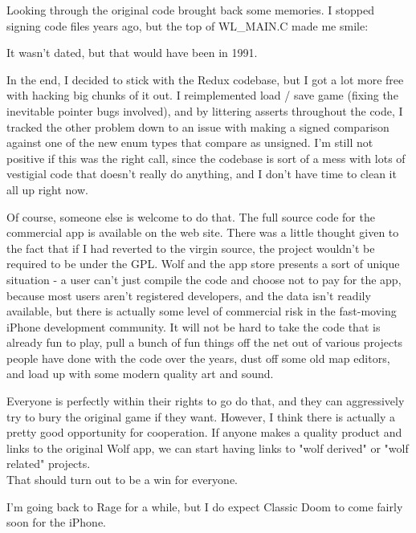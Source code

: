 Looking through the original code brought back some memories.  I stopped signing code files years ago, but the top of WL\_MAIN.C made me smile:\\
\par
\begin{minipage}{\textwidth}

\end{minipage}
\par
It wasn't dated, but that would have been in 1991.\\
\par

In the end, I decided to stick with the Redux codebase, but I got a lot more free with hacking big chunks of it out.  I reimplemented load / save game (fixing the inevitable pointer bugs involved), and by littering asserts throughout the code, I tracked the other problem down to an issue with making a signed comparison against one of the new enum types that compare as unsigned.  I'm still not positive if this was the right call, since the codebase is sort of a mess with lots of vestigial code that doesn't really do anything, and I don't have time to clean it all up right now.\\
\par

Of course, someone else is welcome to do that.  The full source code for the commercial app is available on the web site.  There was a little thought given to the fact that if I had reverted to the virgin source, the project wouldn't be required to be under the GPL.  Wolf and the app store presents a sort of unique situation - a user can't just compile the code and choose not to pay for the app, because most users aren't registered developers, and the data isn't readily available, but there is actually some level of commercial risk in the fast-moving iPhone development community.  It will not be hard to take the code that is already fun to play, pull a bunch of fun things off the net out of various projects people have done with the code over the years, dust off some old map editors, and load up with some modern quality art and sound.\\
\par

Everyone is perfectly within their rights to go do that, and they can aggressively try to bury the original game if they want.  However, I think there is actually a pretty good opportunity for cooperation.  If anyone makes a quality product and links to the original Wolf app, we can start having links to "wolf derived" or "wolf related" projects.\\
That should turn out to be a win for everyone.\\
\par

I'm going back to Rage for a while, but I do expect Classic Doom to come fairly soon for the iPhone.\\
\par

 